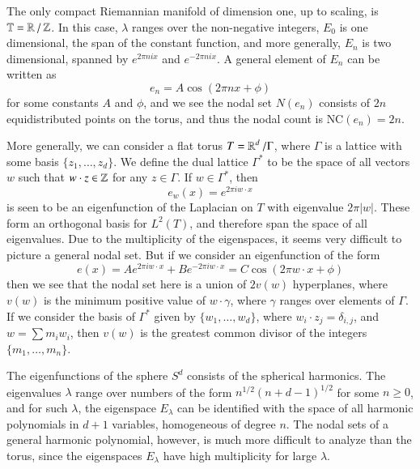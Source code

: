 \begin{example}
    The only compact Riemannian manifold of dimension one, up to scaling, is $\operatorname{\mathbb{T}} = \operatorname{\mathbb{R}} / \operatorname{\mathbb{Z}}$. In this case, $\lambda$ ranges over the non-negative integers, $E_0$ is one dimensional, the span of the constant function, and more generally, $E_n$ is two dimensional, spanned by $e^{2 \pi n i x}$ and $e^{-2 \pi n i x}$. A general element of $E_n$ can be written as
    \[ e_n = A \cos( 2 \pi n x + \phi ) \]
    for some constants $A$ and $\phi$, and we see the nodal set $N(e_n)$ consists of $2n$ equidistributed points on the torus, and thus the nodal count is $\text{NC}(e_n) = 2n$.

    More generally, we can consider a flat torus $T = \operatorname{\mathbb{R}}^d / \Gamma$, where $\Gamma$ is a lattice with some basis $\{ z_1,\dots,z_d \}$. We define the dual lattice $\Gamma^*$ to be the space of all vectors $w$ such that $w \cdot z \in \operatorname{\mathbb{Z}}$ for any $z \in \Gamma$. If $w \in \Gamma^*$, then
    \[ e_w(x) = e^{2 \pi i w \cdot x} \]
    is seen to be an eigenfunction of the Laplacian on $T$ with eigenvalue $2 \pi |w|$. These form an orthogonal basis for $L^2(T)$, and therefore span the space of all eigenvalues. Due to the multiplicity of the eigenspaces, it seems very difficult to picture a general nodal set. But if we consider an eigenfunction of the form
    \[ e(x) = A e^{2 \pi i w \cdot x} + B e^{-2 \pi i w \cdot x} = C \cos(2 \pi w \cdot x + \phi) \]
    then we see that the nodal set here is a union of $2 v(w)$ hyperplanes, where $v(w)$ is the minimum positive value of $w \cdot \gamma$, where $\gamma$ ranges over elements of $\Gamma$. If we consider the basis of $\Gamma^*$ given by $\{ w_1,\dots,w_d \}$, where $w_i \cdot z_j = \delta_{i,j}$, and $w = \sum m_i w_i$, then $v(w)$ is the greatest common divisor of the integers $\{ m_1,\dots,m_n \}$.
\end{example}

\begin{example}
    The eigenfunctions of the sphere $S^d$ consists of the spherical harmonics. The eigenvalues $\lambda$ range over numbers of the form $n^{1/2} (n + d - 1)^{1/2}$ for some $n \geq 0$, and for such $\lambda$, the eigenspace $E_\lambda$ can be identified with the space of all harmonic polynomials in $d+1$ variables, homogeneous of degree $n$. The nodal sets of a general harmonic polynomial, however, is much more difficult to analyze than the torus, since the eigenspaces $E_\lambda$ have high multiplicity for large $\lambda$.
\end{example}

